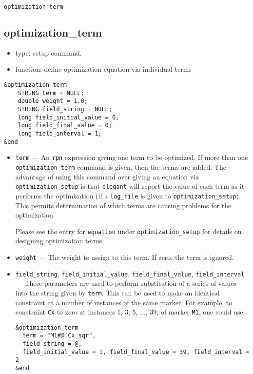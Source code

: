 \documentclass[11pt]{article}
\begin{document}
\begin{latexonly}
\newpage
\begin{center}{\Large\verb|optimization_term|}\end{center}
\end{latexonly}
\subsection{optimization\_term \label{subsec:optimizationterm}}

\begin{itemize}
\item type: setup command.

\item function: define optimization equation via individual terms

\end{itemize}

\begin{verbatim}
&optimization_term
    STRING term = NULL;
    double weight = 1.0;
    STRING field_string = NULL;
    long field_initial_value = 0;
    long field_final_value = 0;
    long field_interval = 1;
&end
\end{verbatim}

\begin{itemize}
\item \verb|term| --- An {\tt rpn} expression giving one term to be optimized.
If more than one \verb|optimization_term| command is given, then the terms are
added.   The advantage of using this command over giving an equation via
\verb|optimization_setup| is that {\tt elegant} will report the value of
each term as it performs the optimization (if a \verb|log_file| is given to
\verb|optimization_setup|).  This permits determination of
which terms are causing problems for the optimization.

Please see the entry for {\tt equation} under {\tt optimization\_setup} for
details on designing optimization terms.

\item \verb|weight| --- The weight to assign to this term.  If zero, the term
        is ignored.


\item \verb|field_string|, \verb|field_initial_value|, \verb|field_final_value|, \verb|field_interval| --- 
  These parameters are used to perform substitution of a series of values into the string given by
  \verb|term|.  This can be used to make an identical constraint at a number of instances
  of the same marker.  For example, to constraint \verb|Cx| to zero at instances 1, 3, 5, ..., 39,
  of marker \verb|M1|, one could use
\begin{verbatim}
&optimization_term
  term = "M1#@.Cx sqr", 
  field_string = @, 
  field_initial_value = 1, field_final_value = 39, field_interval = 2
&end
\end{verbatim}

\end{itemize}
\end{document}
